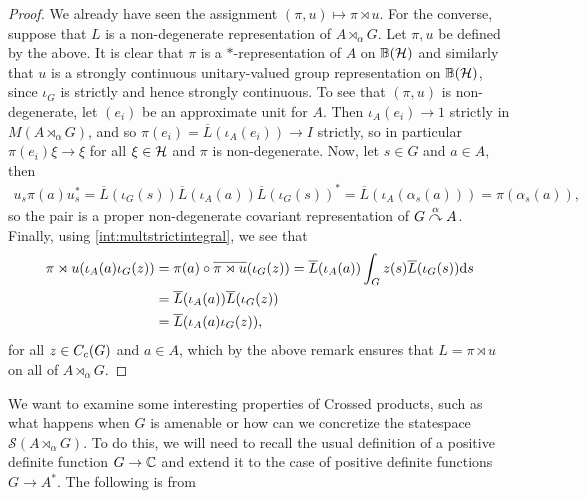 \begin{proof}
We already have seen the assignment $(\pi,u) \mapsto \pi \rtimes u$. For the converse, suppose that $L$ is a non-degenerate representation of $A \rtimes_\alpha G$. Let $\pi, u$ be defined by the above. It is clear that $\pi$ is a $*$-representation of $A$ on $\mathbb{B}(\mathcal{H})$ and similarly that $u$ is a strongly continuous unitary-valued group representation on $\mathbb{B}(\mathcal{H})$, since $\iota_G$ is strictly and hence strongly continuous. To see that $(\pi,u)$ is non-degenerate, let $(e_i)$ be an approximate unit for $A$. Then $\iota_A(e_i) \to 1$ strictly in $M(A \rtimes_\alpha G)$, and so $\pi(e_i) = \overline L(\iota_A(e_i)) \to I$ strictly, so in particular $\pi(e_i) \xi \to \xi$ for all $\xi \in \mathcal{H}$ and $\pi$ is non-degenerate. Now, let $s \in G$ and $a \in A$, then
\begin{align*}
	u_s \pi(a) u_s^* = \overline L(\iota_G(s) ) \overline L (\iota_A(a)) \overline L(\iota_G(s))^* = \overline L( \iota_A(\alpha_s(a))) = \pi(\alpha_{s}(a)),
\end{align*}
so the pair is a proper non-degenerate covariant representation of $G \stackrel{\alpha}{\curvearrowright} A$. Finally, using \cref{int:multstrictintegral}, we see that
\begin{align*}
\pi \rtimes u(\iota_A(a) \iota_G(z)) &= \pi(a) \circ \overline{\pi \rtimes u}(\iota_G(z)) = \overline L(\iota_A(a)) \int_G z(s) \overline L(\iota_G(s)) \mathrm{d} s \\
&= \overline L(\iota_A(a)) \overline L(\iota_G(z)) \\
&= \overline L(\iota_A(a) \iota_G(z)),
\end{align*}
for all $z \in C_c(G)$ and $a \in A$, which by the above remark ensures that $L = \pi \rtimes u$ on all of $A \rtimes_ \alpha G$.
\end{proof}

We want to examine some interesting properties of Crossed products, such as what happens when $G$ is amenable or how can we concretize the statespace $\mathcal{S}(A\rtimes_\alpha G)$. To do this, we will need to recall the usual definition of a positive definite function $G \to \mathbb{C}$ and extend it to the case of positive definite functions $G \to A^*$. The following is from \cite{pedersenalgauto}

